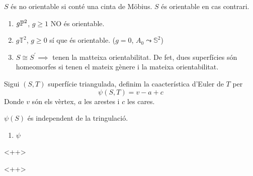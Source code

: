 \begin{defi}[Orientabilitat]
    $S$ és no orientable si conté una cinta de Möbius. $S$ és orientable en cas contrari.
\end{defi}

\begin{example}
    \begin{enumerate}
	\item $g \mathbb{P}^2$, $g \geq 1$ NO és orientable.
	\item $g \mathbb{T}^2$, $g \geq 0$ sí que és orientable. ($g = 0$, $A_0 \leadsto \mathbb{S}^2$)
	\item $S \cong S^\prime \implies $ tenen la matteixa orientabilitat. De fet, dues superfícies
	    són homeomorfes si tenen el mateix gènere i la mateixa orientabilitat.
    \end{enumerate}
\end{example}

\begin{defi}
    Sigui $(S, T)$ superfície triangulada, definim la caacterística d'Euler de $T$ per
    \[
        \psi (S, T) = v - a + c
    \]
    Donde $v$ són els vèrtex, $a$ les arestes i $c$ les cares.
\end{defi}

\begin{teo*}
    $\psi(S)$ és independent de la tringulació.
\end{teo*}

\begin{example}
    \begin{enumerate}
	\item $\psi$
    \end{enumerate}<++>
\end{example}<++>
